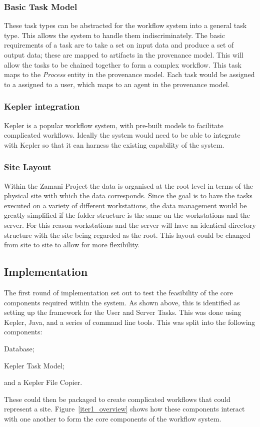 \documentclass[12pt,a4paper]{report}
\begin{document}
\subsubsection*{Basic Task Model}
These task types can be abstracted for the workflow system into a general
task type. This allows the system to handle them indiscriminately. The basic
requirements of a task are to take a set on input data and produce a set
of output data; these are mapped to artifacts in the provenance model.
This will allow the tasks to be chained together to form
a complex workflow. This task maps to the \emph{Process} entity in the
provenance model. Each task would be assigned to a assigned to a user, which
maps to an agent in the provenance model.

\subsubsection*{Kepler integration}
Kepler is a popular workflow system, with pre-built models to
facilitate complicated workflows. Ideally the system would need to be able
to integrate with Kepler so that it can harness the existing capability
of the system.

\subsubsection*{Site Layout}
Within the Zamani Project the data is organised at the root level in terms of
the physical site with which the data corresponds. Since the goal is to have the
tasks executed on a variety of different workstations, the data management
would be greatly simplified if the folder structure is the same on the workstations
and the server. For this reason workstations and the server will have
an identical directory structure with the site being regarded as the root. This
layout could be changed from site to site to allow for more flexibility.

\subsection{Implementation}

The first round of implementation set out to test the feasibility of the
core components required within the system. As shown above, this is identified
as setting up the framework for the User and Server Tasks. This was done using
Kepler, Java, and a series of command line tools. This was split into the following
components: \begin{inparaenum}[(i)] \item Database; \item Kepler Task Model;
\item and a Kepler File Copier. \end{inparaenum} These could then be packaged
to create complicated workflows that could represent a site.
Figure~\ref{iter1_overview} shows how these components interact with one another to form the core components of the workflow system.
\end{document}
